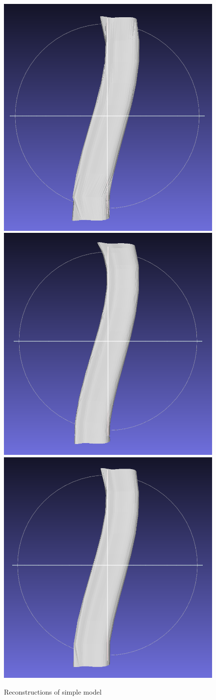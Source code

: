 \documentclass[11p, titlepage]{article}
\newcommand{\reconstructionright}{0.67}
\begin{document}
\begin{figure}[h!]
\begin{minipage}[b]{\reconstructionright\linewidth}
       \hfill
       {\includegraphics[width=.48\linewidth]{reconstructions/dtw-simple-10}}
       \hfill
       {\includegraphics[width=.48\linewidth]{reconstructions/cspa50-simple-50}}%
       \hfill
       {\includegraphics[width=.48\linewidth]{reconstructions/cspa50-simple-10}}
     \end{minipage}%
        \caption{Reconstructions of simple model}
        \label{fig:simple_reconstructions}
\end{figure}
\end{document}
